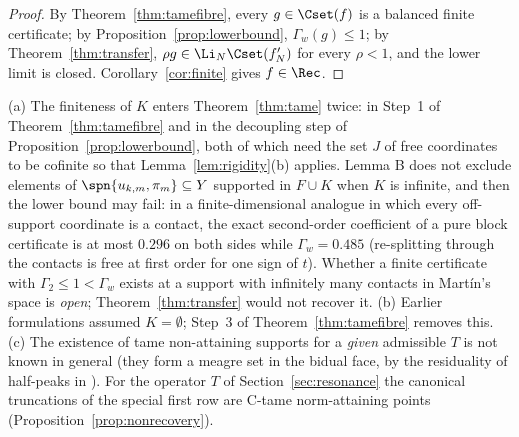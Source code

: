 \begin{proof}
By Theorem~\ref{thm:tamefibre}, every $g\in\Cset(f)$ is a balanced finite
certificate; by Proposition~\ref{prop:lowerbound}, $\Gamma_w(g)\le1$; by
Theorem~\ref{thm:transfer}, $\rho g\in\Li_N\Cset(f'_N)$ for every $\rho<1$,
and the lower limit is closed.  Corollary~\ref{cor:finite} gives $f\in\Rec$.
\end{proof}

\begin{remark}\label{rem:kinks}
(a) The finiteness of $K$ enters Theorem~\ref{thm:tame} twice: in Step~1 of
Theorem~\ref{thm:tamefibre} and in the decoupling step of
Proposition~\ref{prop:lowerbound}, both of which need the set $J$ of free
coordinates to be cofinite so that Lemma~\ref{lem:rigidity}(b) applies.
Lemma B does not exclude elements of $\spn\{u_{k,m},\pi_m\}\subseteq Y$
supported in $F\cup K$ when $K$ is infinite, and then the lower bound may
fail: in a finite-dimensional analogue in which every off-support
coordinate is a contact, the exact second-order coefficient of a pure block
certificate is at most $0.296$ on both sides while $\Gamma_w=0.485$
(re-splitting through the contacts is free at first order for one sign of
$t$).  Whether a finite certificate with $\Gamma_2\le1<\Gamma_w$ exists at a
support with infinitely many contacts in Mart\'in's space is \emph{open};
Theorem~\ref{thm:transfer} would not recover it.  (b) Earlier formulations
assumed $K=\emptyset$; Step~3 of Theorem~\ref{thm:tamefibre} removes this.
(c) The existence of tame non-attaining supports for a \emph{given}
admissible $T$ is not known in general (they form a meagre set in the
bidual face, by the residuality of half-peaks in \cite[Section~3]{PrA}).
For the operator $T$ of Section~\ref{sec:resonance} the canonical
truncations of the special first row are C-tame norm-attaining points
(Proposition~\ref{prop:nonrecovery}).
\end{remark}

